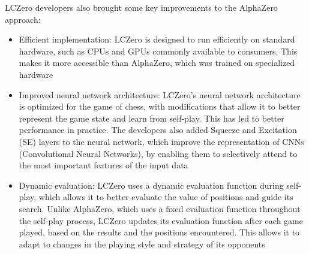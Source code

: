 LCZero developers also brought some key improvements to the AlphaZero approach:
\begin{itemize}
    \item Efficient implementation: LCZero is designed to run efficiently on standard hardware, such as CPUs and GPUs commonly available to consumers. This makes it more accessible than AlphaZero, which was trained on specialized hardware
    \item Improved neural network architecture: LCZero's neural network architecture is optimized for the game of chess, with modifications that allow it to better represent the game state and learn from self-play. This has led to better performance in practice. The developers also added Squeeze and Excitation (SE) layers to the neural network, which improve the representation of CNNs (Convolutional Neural Networks), by enabling them to selectively attend to the most important features of the input data
    \item Dynamic evaluation: LCZero uses a dynamic evaluation function during self-play, which allows it to better evaluate the value of positions and guide its search. Unlike AlphaZero, which uses a fixed evaluation function throughout the self-play process, LCZero updates its evaluation function after each game played, based on the results and the positions encountered. This allows it to adapt to changes in the playing style and strategy of its opponents
\end{itemize}